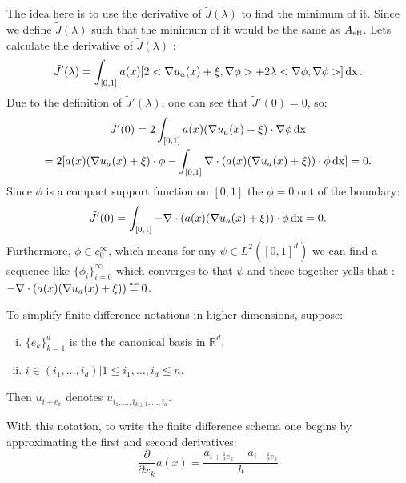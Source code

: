 The idea here is to use the derivative of $\tilde{J}(\lambda)$ to find the minimum of it. Since we define $\tilde{J}(\lambda)$ such that the minimum of it would be the same as $A_{\operatorname{eff}}$. Lets calculate the derivative of $\tilde{J}(\lambda)$ :
\begin{equation}
\tilde{J}'(\lambda)= \int_{[0,1]} a(x) [2<\nabla u_{a}(x)+\xi, \nabla\phi> + 2\lambda <\nabla\phi,\nabla\phi>] \operatorname{dx}.
\end{equation}
Due to the definition of $\tilde{J}'(\lambda)$, one can see that $\tilde{J}'(0) = 0$, so:
\begin{multline}
\tilde{J}'(0)= 2\int_{[0,1]} a(x) (\nabla u_{a}(x)+\xi) \cdot \nabla\phi \operatorname{dx}\\
= 2 [a(x)(\nabla u_{a}(x)+\xi) \cdot \phi - \int_{[0,1]} \nabla \cdot(a(x) (\nabla u_{a}(x)+\xi))\cdot \phi \operatorname{dx}] = 0.
\end{multline}
Since $\phi$ is a compact support function on $[0,1]$ the $\phi = 0$ out of the boundary:
\begin{equation}
\tilde{J}'(0) = \int_{[0,1]} - \nabla \cdot(a(x) (\nabla u_{a}(x)+\xi))\cdot \phi \operatorname{dx} = 0.
\end{equation}
Furthermore, $\phi \in c_{0}^{\infty}$, which means for any $\psi \in L^{2}([0,1]^d)$ we can find a sequence like $\{\phi_{i}\}_{i=0}^{\infty}$ which converges to that $\psi$ and these together yells that :\\ $- \nabla \cdot(a(x) (\nabla u_{a}(x)+\xi))\aeeq0$.\\
\begin{notation}
	To simplify finite difference notations in higher dimensions, suppose:
	\begin{enumerate}[i.]
		\item $\{e_{k}\}_{k=1}^{d}$ is the the canonical basis in $\mathbb{R}^{d}$,
		\item $i \in {(i_1, \dots, i_d) \vert 1 \leq i_1, \dots, i_d \leq n}$. 
	\end{enumerate}
	Then $u_{i \pm e_k }$ denotes $u_{i_1, \dots, i_{k \pm 1}, \dots, i_d}$.
\end{notation}
With this notation, to write the finite difference schema one begins by approximating the first and second derivatives: 
\begin{equation}
\frac{\partial}{\partial x_k} a(x) = \frac{a_{i+\frac{1}{2}e_{k}} - a_{i-\frac{1}{2}e_{k}}}{h}
\end{equation}
